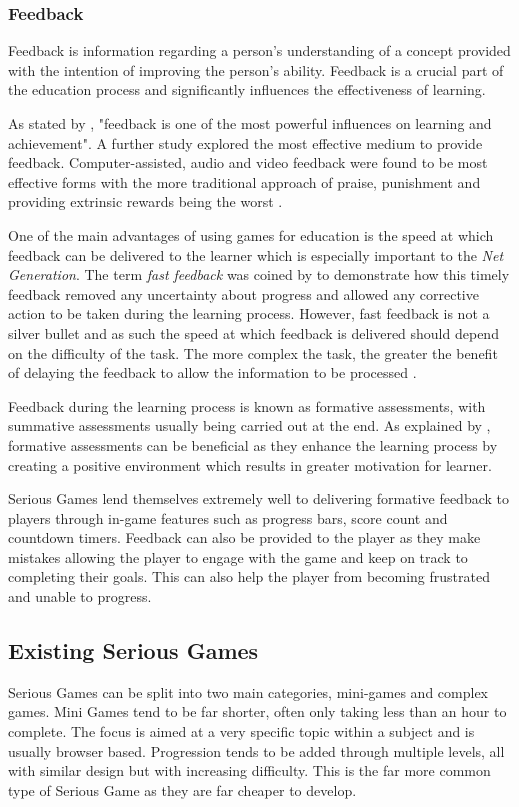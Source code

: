 \documentclass[12pt,a4paper]{report}
\begin{document}
\subsubsection{Feedback}
Feedback is information regarding a person's understanding of a concept provided with the intention of improving the person's ability. Feedback is a crucial part of the education process and significantly influences the effectiveness of learning.

As stated by \cite{hattie2007power}, "feedback is
one of the most powerful influences on learning and achievement". A further study explored the most effective medium to provide feedback. Computer-assisted, audio and video feedback were found to be most effective forms with the more traditional approach of praise, punishment and providing extrinsic rewards being the worst \citep{hattie2007power}. 

One of the main advantages of using games for education is the speed at which feedback can be delivered to the learner which is especially important to the \textit{Net Generation}. The term \textit{fast feedback} was coined by \cite{lumsden1988characteristics} to demonstrate how this timely feedback removed any uncertainty about progress and allowed any corrective action to be taken during the learning process. However, fast feedback is not a silver bullet and as such the speed at which feedback is delivered should depend on the difficulty of the task. The more complex the task, the greater the benefit of delaying the feedback to allow the information to be processed \cite{clariana2000applying}. 

Feedback during the learning process is known as formative assessments, with summative assessments usually being carried out at the end. As explained by \cite{irons2007enhancing}, formative assessments can be beneficial as they enhance the learning process by creating a positive environment which results in greater motivation for learner. 

Serious Games lend themselves extremely well to delivering formative feedback to players through in-game features such as progress bars, score count and countdown timers. Feedback can also be provided to the player as they make mistakes allowing the player to engage with the game and keep on track to completing their goals. This can also help the player from becoming frustrated and unable to progress.

\subsection{Existing Serious Games}
Serious Games can be split into two main categories, mini-games and complex games. Mini Games tend to be far shorter, often only taking less than an hour to complete. The focus is aimed at a very specific topic within a subject and is usually browser based. Progression tends to be added through multiple levels, all with similar design but with increasing difficulty. This is the far more common type of Serious Game as they are far cheaper to develop.
\end{document}
